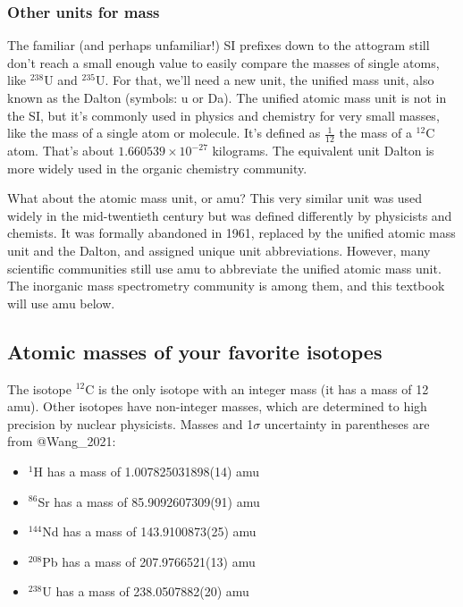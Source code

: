 \documentclass[
  letterpaper,
  DIV=11,
  numbers=noendperiod]{scrreprt}
\providecommand{\tightlist}{%
  \setlength{\itemsep}{0pt}\setlength{\parskip}{0pt}}\usepackage{longtable,booktabs,array}
\begin{document}
\subsubsection{Other units for mass}\label{other-units-for-mass}

The familiar (and perhaps unfamiliar!) SI prefixes down to the attogram
still don't reach a small enough value to easily compare the masses of
single atoms, like \(^{238}\)U and \(^{235}\)U. For that, we'll need a
new unit, the unified mass unit, also known as the Dalton (symbols: u or
Da). The unified atomic mass unit is not in the SI, but it's commonly
used in physics and chemistry for very small masses, like the mass of a
single atom or molecule. It's defined as \(\frac{1}{12}\) the mass of a
\(^{12}\)C atom. That's about \(1.660539 \times 10^{-27}\) kilograms.
The equivalent unit Dalton is more widely used in the organic chemistry
community.

What about the atomic mass unit, or amu? This very similar unit was used
widely in the mid-twentieth century but was defined differently by
physicists and chemists. It was formally abandoned in 1961, replaced by
the unified atomic mass unit and the Dalton, and assigned unique unit
abbreviations. However, many scientific communities still use amu to
abbreviate the unified atomic mass unit. The inorganic mass spectrometry
community is among them, and this textbook will use amu below.

\subsection{Atomic masses of your favorite
isotopes}\label{atomic-masses-of-your-favorite-isotopes}

The isotope \(^{12}\)C is the only isotope with an integer mass (it has
a mass of 12 amu). Other isotopes have non-integer masses, which are
determined to high precision by nuclear physicists. Masses and
1\(\sigma\) uncertainty in parentheses are from @Wang\_2021:

\begin{itemize}
\tightlist
\item
  \(^{1}\)H has a mass of 1.007825031898(14) amu
\item
  \(^{86}\)Sr has a mass of 85.9092607309(91) amu
\item
  \(^{144}\)Nd has a mass of 143.9100873(25) amu
\item
  \(^{208}\)Pb has a mass of 207.9766521(13) amu
\item
  \(^{238}\)U has a mass of 238.0507882(20) amu
\end{itemize}
\end{document}
